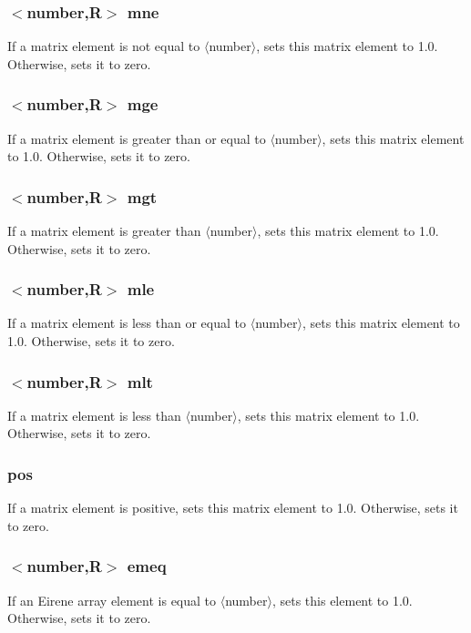 \documentclass[a4paper,10pt]{report}
\begin{document}
\subsubsection{$<$number,{\bf R}$>$ mne}\label{sec:mne}
If a matrix element is not equal to $\langle$number$\rangle$, sets this matrix element to 1.0.
Otherwise, sets it to zero.

\subsubsection{$<$number,{\bf R}$>$ mge}\label{sec:mge}
If a matrix element is greater than or equal to $\langle$number$\rangle$, sets this matrix element to 1.0.
Otherwise, sets it to zero.

\subsubsection{$<$number,{\bf R}$>$ mgt}\label{sec:mgt}
If a matrix element is greater than $\langle$number$\rangle$, sets this matrix element to 1.0.
Otherwise, sets it to zero.

\subsubsection{$<$number,{\bf R}$>$ mle}\label{sec:mle}
If a matrix element is less than or equal to $\langle$number$\rangle$, sets this matrix element to 1.0.
Otherwise, sets it to zero.

\subsubsection{$<$number,{\bf R}$>$ mlt}\label{sec:mlt}
If a matrix element is less than $\langle$number$\rangle$, sets this matrix element to 1.0.
Otherwise, sets it to zero.

\subsubsection{pos}\label{sec:pos}
If a matrix element is positive, sets this matrix element to 1.0.
Otherwise, sets it to zero.

\subsubsection{$<$number,{\bf R}$>$ emeq}\label{sec:emeq}
If an Eirene array element is equal to $\langle$number$\rangle$, sets this element to 1.0.
Otherwise, sets it to zero.
\end{document}
